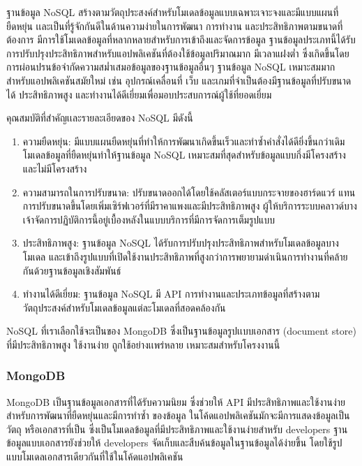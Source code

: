 ฐานข้อมูล NoSQL สร้างตามวัตถุประสงค์สำหรับโมเดลข้อมูลแบบเฉพาะเจาะจงและมีแบบแผนที่ยืดหยุ่น เเละเป็นที่รู้จักกันดีในด้านความง่ายในการพัฒนา การทำงาน และประสิทธิภาพตามขนาดที่ต้องการ มีการใช้โมเดลข้อมูลที่หลากหลายสำหรับการเข้าถึงและจัดการข้อมูล ฐานข้อมูลประเภทนี้ได้รับการปรับปรุงประสิทธิภาพสำหรับแอปพลิเคชันที่ต้องใช้ข้อมูลปริมาณมาก มีเวลาแฝงต่ำ ซึ่งเกิดขึ้นโดยการผ่อนปรนข้อจำกัดความสม่ำเสมอข้อมูลของฐานข้อมูลอื่นๆ ฐานข้อมูล NoSQL เหมาะสมมากสำหรับแอปพลิเคชันสมัยใหม่ เช่น อุปกรณ์เคลื่อนที่ เว็บ และเกมที่จำเป็นต้องมีฐานข้อมูลที่ปรับขนาดได้ ประสิทธิภาพสูง และทำงานได้ดีเยี่ยมเพื่อมอบประสบการณ์ผู้ใช้ที่ยอดเยี่ยม 

คุณสมบัติที่สําคัญเเละรายละเอียดของ NoSQL มีดังนี้
%
\begin{enumerate}
  \item ความยืดหยุ่น: มีแบบแผนยืดหยุ่นที่ทำให้การพัฒนาเกิดขึ้นเร็วและทำซ้ำคำสั่งได้ดียิ่งขึ้นกว่าเดิม โมเดลข้อมูลที่ยืดหยุ่นทำให้ฐานข้อมูล NoSQL เหมาะสมที่สุดสำหรับข้อมูลแบบกึ่งมีโครงสร้างและไม่มีโครงสร้าง

  \item ความสามารถในการปรับขนาด: ปรับขนาดออกได้โดยใช้คลัสเตอร์แบบกระจายของฮาร์ดแวร์ แทนการปรับขนาดขึ้นโดยเพิ่มเซิร์ฟเวอร์ที่มีราคาแพงและมีประสิทธิภาพสูง ผู้ให้บริการระบบคลาวด์บางเจ้าจัดการปฏิบัติการนี้อยู่เบื้องหลังในแบบบริการที่มีการจัดการเต็มรูปแบบ

  \item ประสิทธิภาพสูง: ฐานข้อมูล NoSQL ได้รับการปรับปรุงประสิทธิภาพสำหรับโมเดลข้อมูลบางโมเดล และเข้าถึงรูปแบบที่เปิดใช้งานประสิทธิภาพที่สูงกว่าการพยายามดำเนินการทำงานที่คล้ายกันด้วยฐานข้อมูลเชิงสัมพันธ์

  \item  ทำงานได้ดีเยี่ยม: ฐานข้อมูล NoSQL มี API การทำงานและประเภทข้อมูลที่สร้างตามวัตถุประสงค์สำหรับโมเดลข้อมูลแต่ละโมเดลที่สอดคล้องกัน
\end{enumerate}


NoSQL ที่เราเลือกใช้จะเป็นของ MongoDB ซึ่งเป็นฐานข้อมูลรูปเเบบเอกสาร (document store) ที่มีประสิทธิภาพสูง ใช้งานง่าย ถูกใช้อย่างเเพร่หลาย เหมาะสมสําหรับโครงงานนี้

\subsubsection{MongoDB}


MongoDB เป็นฐานข้อมูลเอกสารที่ได้รับความนิยม ซึ่งช่วยให้ API มีประสิทธิภาพและใช้งานง่ายสำหรับการพัฒนาที่ยืดหยุ่นและมีการทำซ้ำ ของข้อมูล ในโค้ดแอปพลิเคชันมักจะมีการแสดงข้อมูลเป็นวัตถุ หรือเอกสารที่เป็น  ซึ่งเป็นโมเดลข้อมูลที่มีประสิทธิภาพและใช้งานง่ายสำหรับ developers ฐานข้อมูลแบบเอกสารยังช่วยให้ developers จัดเก็บและสืบค้นข้อมูลในฐานข้อมูลได้ง่ายขึ้น โดยใช้รูปแบบโมเดลเอกสารเดียวกันที่ใช้ในโค้ดแอปพลิเคชัน 


